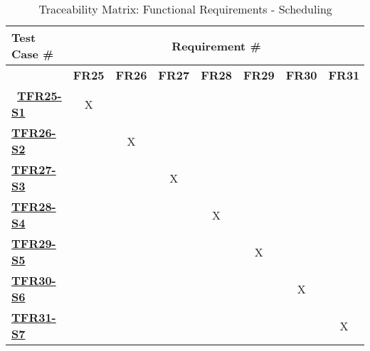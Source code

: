 \documentclass[12pt, titlepage]{article}
\begin{document}
\begin{landscape}
\begin{table}[H]
    \centering
    \begin{adjustbox}{width=1\textwidth}
    \begin{tabular}{l|ccccccc}
        \textbf{Test Case \#} & \multicolumn{7}{c}{\textbf{Requirement \#}}\\
        \hline
        ~ & \textbf{FR25} & \textbf{FR26} & \textbf{FR27} & \textbf{FR28} & \textbf{FR29} & \textbf{FR30} & \textbf{FR31} \\\
        \hyperref[TFR25-S1] \textbf{TFR25-S1}  & X & ~ & ~ & ~ & ~ & ~ & ~ \\
        \hyperref[TFR26-S2] \textbf{TFR26-S2}  & ~ & X & ~ & ~ & ~ & ~ & ~\\
        \hyperref[TFR27-S3] \textbf{TFR27-S3}  & ~ & ~ & X & ~ & ~ & ~ & ~ \\
        \hyperref[TFR28-S4] \textbf{TFR28-S4}  & ~ & ~ & ~ & X & ~ & ~ & ~ \\
        \hyperref[TFR29-S5] \textbf{TFR29-S5}  & ~ & ~ & ~ & ~ & X & ~ & ~ \\
        \hyperref[TFR30-S6] \textbf{TFR30-S6}  & ~ & ~ & ~ & ~ & ~ & X & ~ \\
        \hyperref[TFR31-S7] \textbf{TFR31-S7}  & ~ & ~ & ~ & ~ & ~ & ~ & X \\
    \end{tabular}
    \end{adjustbox}
    \caption{Traceability Matrix: Functional Requirements - Scheduling}
    \label{Traceability Matrix: Functional Requirements - Scheduling}
\end{table}


\end{landscape}
\end{document}
